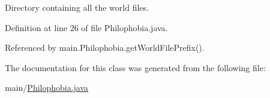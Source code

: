 Directory containing all the world files. 



Definition at line 26 of file Philophobia.\-java.



Referenced by main.\-Philophobia.\-get\-World\-File\-Prefix().



The documentation for this class was generated from the following file\-:\begin{DoxyCompactItemize}
\item 
main/\hyperlink{a00052}{Philophobia.\-java}\end{DoxyCompactItemize}
